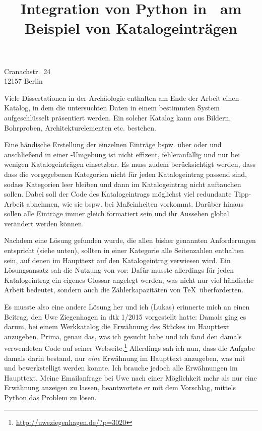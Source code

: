 \documentclass[ngerman]{dtk}
\begin{document}
\title{Integration von Python in \XeLaTeX\ am Beispiel von Katalogeinträgen}
%
			{Cranachstr.~24\\
			12157 Berlin\\
			}
\maketitle



Viele Dissertationen in der Archäologie enthalten am Ende der Arbeit einen Katalog, 
in dem die untersuchten Daten in einem bestimmten System aufgeschlüsselt präsentiert werden.
Ein solcher Katalog kann aus  Bildern, Bohrproben, Architekturelementen etc. bestehen.

Eine händische Erstellung der einzelnen Einträge bspw. über  oder  
und anschließend in einer -Umgebung ist nicht effizent, fehleranfällig und nur bei wenigen Katalogeinträgen einsetzbar.
Es muss zudem berücksichtigt werden, dass  dass die vorgegebenen Kategorien nicht für jeden Katalogeintrag passend sind, 
sodass  Kategorien leer bleiben  und dann im Katalogeintrag nicht auftauchen sollen.
Dabei soll der Code des Katalogeintrags möglichst viel redundante Tipp-Arbeit abnehmen, wie sie bspw. bei Maßeinheiten vorkommt.
Darüber hinaus sollen alle Einträge immer gleich formatiert sein und ihr Aussehen global verändert werden können.

Nachdem  eine  Lösung gefunden wurde, die allen bisher genannten Anforderungen entspricht (siehe unten),
sollten in einer Kategorie alle Seitenzahlen enthalten sein, auf denen im Haupttext auf den Katalogeintrag verwiesen wird.
Ein  Lösungsansatz sah die Nutzung von   vor: 
Dafür musste allerdings für jeden Katalogeintrag ein eigenes Glossar angelegt werden, was nicht nur viel händische Arbeit bedeutet,
sondern auch die Zählerkapazitäten von \TeX\ überforderten.

Es musste also eine andere Lösung her und ich (Lukas) erinnerte mich an einen Beitrag, den Uwe Ziegenhagen in dtk 1/2015 vorgestellt hatte:
Damals ging es darum, bei einem Werkkatalog die Erwähnung des Stückes im Haupttext anzugeben. 
Prima, genau das, was ich gesucht habe und ich fand den damals verwendeten Code auf seiner Webseite.\footnote{\url{http://uweziegenhagen.de/?p=3020}}
Allerdings  sah ich nun, dass die Aufgabe  damals darin bestand, nur \emph{eine} Erwähnung im  Haupttext anzugeben,
was mit  und  bewerkstelligt werden konnte.
Ich brauche jedoch alle Erwähnungen im Haupttext.
Meine Emailanfrage bei Uwe nach einer Möglichkeit mehr als nur eine Erwähnung anzeigen zu lassen,
beantwortete er mit dem Vorschlag, mittels Python das Problem zu lösen.
\end{document}
